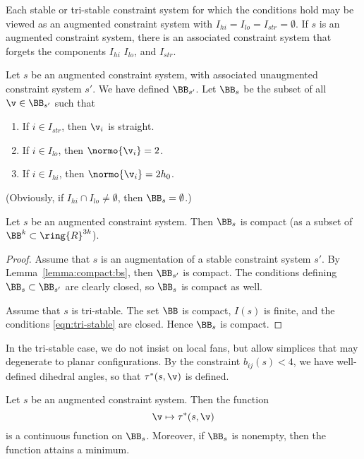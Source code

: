 Each stable or tri-stable constraint system  for which the conditions hold may be
viewed as an augmented constraint system with $I_{hi}=I_{lo}=I_{str}=\emptyset$.
If $s$ is an augmented constraint
system, there is an associated constraint system that forgets the components
$I_{hi}$ $I_{lo}$, and $I_{str}$.

\begin{definition}  Let $s$ be an augmented constraint system, with
associated unaugmented constraint system $s'$.
We have defined $\BB_{s'}$. Let $\BB_{s}$ be the subset of all  $\v\in\BB_{s'}$ such that
\begin{enumerate}
\item If $i\in I_{str}$,  then $\v_i$ is straight.
\item If $i\in I_{lo}$,  then $\normo{\v_i}=2$.
\item If $i\in I_{hi}$,  then $\normo{\v_i}=2h_0$.
\end{enumerate}
\end{definition}



(Obviously, if $I_{hi}\cap I_{lo}\ne \emptyset$, then $\BB_s=\emptyset$.)

\begin{lemma} \label{lemma:aug-compact}
Let $s$ be an augmented constraint system. Then
$\BB_s$ is compact (as a subset of
$\BB^k \subset \ring{R}^{3k}$).
\end{lemma}

\begin{proof}  Assume that $s$ is an augmentation of a stable constraint 
system $s'$.
By Lemma~\ref{lemma:compact:bs},  then $\BB_{s'}$ is compact.  
The conditions defining $\BB_s\subset \BB_{s'}$ are clearly closed, so
$\BB_s$ is compact as well.

Assume that $s$ is tri-stable.  The set $\BB$ is compact, $I(s)$ is finite,
and the conditions \eqref{eqn:tri-stable} are closed.  Hence $\BB_s$ is
compact.
\end{proof}

 In the tri-stable case, we do not insist on local fans, but allow simplices that
may  degenerate to planar configurations.  By the constraint $b_{ij}(s)<4$, we have well-defined dihedral angles, so that $\tau^*(s,\v)$ is defined.

\begin{lemma}[continuity]\label{lemma:compact-fan}
Let $s$ be an augmented constraint system.  Then the function 
\[
\v\mapsto \tau^*(s,\v)
\]
is a continuous function on $\BB_s$.  Moreover, if $\BB_s$ is
nonempty, then the function attains a minimum.
\end{lemma}

